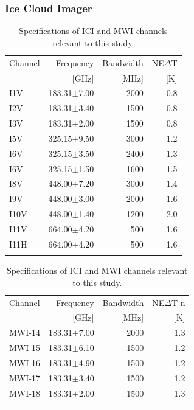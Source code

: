 \documentclass[amt, manuscript]{copernicus}
\begin{document}
\subsubsection{Ice Cloud Imager}
%
\begin{table}[t]	
	\caption{Specifications of ICI and MWI channels relevant to this study.}
	\label{tab:ICI_MWI_channels}
	\begin{tabular}{lrrr}
		\tophline
		Channel & Frequency 	& Bandwidth  	&NE$\Delta$T	\\
				& [GHz]			& [MHz]			& [K]			\\
		\middlehline
		I1V&	183.31$\pm$7.00    & 2000 			& 0.8 		\\
		I2V&	183.31$\pm$3.40    & 1500 			& 0.8 		\\
		I3V&	183.31$\pm$2.00    & 1500			& 0.8 		\\
		I5V&	325.15$\pm$9.50    & 3000			& 1.2 		\\
		I6V&	325.15$\pm$3.50    & 2400			& 1.3 		\\
		I6V&	325.15$\pm$1.50    & 1600			& 1.5 		\\
		I8V&	448.00$\pm$7.20    & 3000			& 1.4 		\\
		I9V&	448.00$\pm$3.00    & 2000			& 1.6 		\\
		I10V&	448.00$\pm$1.40    & 1200			& 2.0 		\\
		I11V&	664.00$\pm$4.20    & \phantom{0}500	& 1.6 		\\
		I11H&	664.00$\pm$4.20    & \phantom{0}500 & 1.6 		\\		
		\bottomhline
	\end{tabular}
	\begin{tabular}{lrrr}
		\tophline
		Channel & Frequency 	& Bandwidth  	&NE$\Delta$T	n\\
				& [GHz]			& [MHz]			& [K]			\\
		\middlehline
		MWI-14&	183.31$\pm$7.00    & 2000 			& 1.3 		\\
		MWI-15&	183.31$\pm$6.10    & 1500			& 1.2 		\\
		MWI-16&	183.31$\pm$4.90    & 1500			& 1.2 		\\
		MWI-17&	183.31$\pm$3.40    & 1500			& 1.2 		\\
		MWI-18&	183.31$\pm$2.00    & 1500			& 1.3 		\\	
		\bottomhline
	\end{tabular}

	\belowtable{} %
\end{table}
\end{document}
